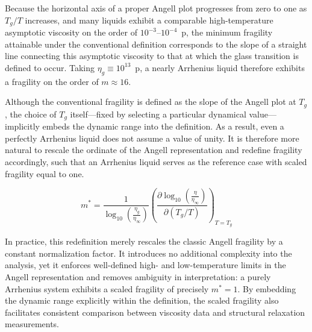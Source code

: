 Because the horizontal axis of a proper Angell plot progresses from zero to one as $T_g/T$ increases, and many liquids exhibit a comparable high-temperature asymptotic viscosity on the order of $10^{-3}$--$10^{-4}$~p, the minimum fragility attainable under the conventional definition corresponds to the slope of a straight line connecting this asymptotic viscosity to that at which the glass transition is defined to occur. Taking $\eta_g \equiv 10^{13}$~p, a nearly Arrhenius liquid therefore exhibits a fragility on the order of $m \approx 16$.

Although the conventional fragility is defined as the slope of the Angell plot at $T_g$, the choice of $T_g$ itself---fixed by selecting a particular dynamical value---implicitly embeds the dynamic range into the definition. As a result, even a perfectly Arrhenius liquid does not assume a value of unity. It is therefore more natural to rescale the ordinate of the Angell representation and redefine fragility accordingly, such that an Arrhenius liquid serves as the reference case with scaled fragility equal to one.

\begin{equation}
	m^*=\frac{1}{\log_{10}\left( \frac{\eta_g}{ \eta_\infty}\right )} \left ( \frac{\partial \log_{10}\left( \frac{\eta}{ \eta_\infty}\right )}{\partial \left ( T_g/T \right )} \right )_{T=T_g}
	\label{eqn:scaledfragility}
\end{equation}

In practice, this redefinition merely rescales the classic Angell fragility by a constant normalization factor. It introduces no additional complexity into the analysis, yet it enforces well-defined high- and low-temperature limits in the Angell representation and removes ambiguity in interpretation: a purely Arrhenius system exhibits a scaled fragility of precisely $m^{\ast}=1$. By embedding the dynamic range explicitly within the definition, the scaled fragility also facilitates consistent comparison between viscosity data and structural relaxation measurements.

